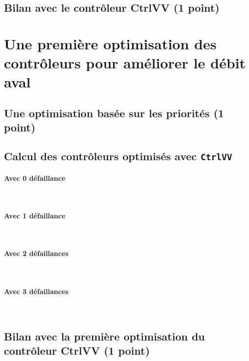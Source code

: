 \documentclass[a4paper]{book}
\begin{document}
\subsection{Bilan avec le contrôleur CtrlVV (1 point)}

\section{Une première optimisation des contrôleurs pour améliorer le débit aval}
\subsection{Une optimisation basée sur les priorités (1 point)}
\small{}

\subsection{Calcul des contrôleurs optimisés avec {\tt CtrlVV}}
\paragraph{Avec 0 défaillance}\ \\


\paragraph{Avec 1 défaillance}\ \\


\paragraph{Avec 2 défaillances}\ \\


\paragraph{Avec 3 défaillances}\ \\


\subsection{Bilan avec la première optimisation du contrôleur CtrlVV (1 point)}
\end{document}
